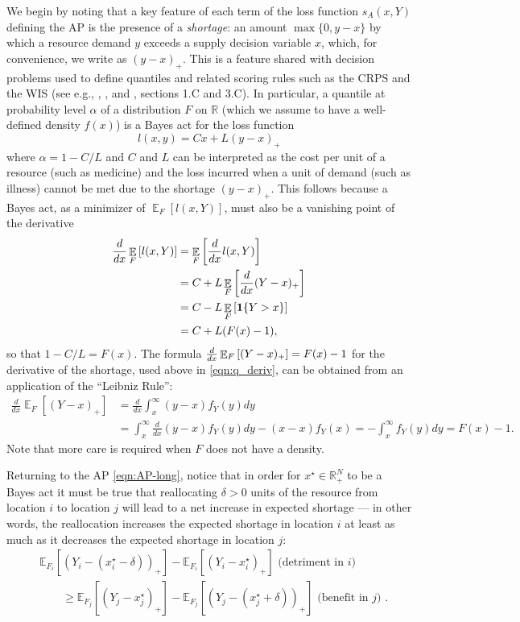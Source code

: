 \documentclass{article}\usepackage[]{graphicx}\usepackage[]{xcolor}
\DeclareMathOperator{\Ex}{\mathbb{E}}
\begin{document}
We begin by noting that a key feature of each term of the loss function $s_A(x, Y)$ defining the AP is the presence of 
a \emph{shortage}: an amount $\max\{0,y-x\}$ by which a resource demand $y$ exceeds a supply decision variable $x$,
which, for convenience, we write as $(y-x)_{+}$.  This is a feature shared with decision problems used to define quantiles 
and related scoring rules such as the
CRPS and the WIS (see e.g., \cite{gneiting2011quantiles}, \cite{jose2009evaluating}, and \cite{royset2022optimization},
sections 1.C and 3.C). In particular, 
a quantile at probability level $\alpha$ of a
distribution $F$ on $\mathbb{R}$ (which we assume to have a well-defined density $f(x)$) is a Bayes act for the loss
function
\[
l(x,y) = Cx + L(y-x)_{+}
\]
where $\alpha = 1-C/L$ and $C$ and $L$ can be interpreted as the cost per unit of a resource (such as medicine) and the
loss incurred when a unit of demand (such as illness) cannot be met due to the shortage $(y-x)_{+}$.  This follows
because a Bayes act, as a minimizer of $\Ex_F[l(x,Y)]$, must also be a vanishing point of the derivative
\begin{align}
\dby{}{x} \Ex_F\left[l(x,Y)\right] &= \Ex_F\left[\dby{}{x}l(x,Y)\right] \nonumber\\
&= C + L\Ex_F\left[\dby{}{x}(Y-x)_+\right] \nonumber\\
&= C - L\Ex_F\left[\mathbf{1}\{Y > x\}\right] \nonumber\\
&= C + L(F(x) - 1), \label{eqn:q_deriv}
\end{align}
so that $1-C/L = F(x)$.
The formula $\dby{}{x}\Ex_F\left[(Y-x)_+\right] = F(x) - 1$ for the derivative of the shortage, used above in
\eqref{eqn:q_deriv}, can be obtained from an application of the ``Leibniz Rule'':
\begin{align}
	\frac{d}{dx} \Ex_F [(Y-x)_{+}] &= \frac{d}{dx} \int_{x}^{\infty} (y-x) f_Y(y)dy \nonumber\\
	&= \int_{x}^{\infty} \frac{d}{dx}(y-x) f_Y(y)dy - (x-x) f_Y(x) = -\int_{x}^{\infty} f_Y(y)dy = F(x)-1. \label{eqn:shortage_deriv}
\end{align}
Note that more care is required when $F$ does not have a density.

Returning to the AP \eqref{eqn:AP-long}, notice that in order for $x^{\star} \in \mathbb{R}^N_{+}$ to be a Bayes act it must be true that reallocating $\delta > 0$ units of
the resource from location $i$ to location $j$ will lead to a net increase in expected shortage --- in other words, the
reallocation increases the expected shortage in location $i$ at least as much as it decreases the expected shortage
in location $j$:
\begin{align*}
&\mathbb{E}_{F_i}[(Y_i - (x^{\star}_i - \delta))_{+}] - \mathbb{E}_{F_i}[(Y_i - x^{\star}_i)_{+}]
\text{ (detriment in $i$) } \nonumber \\
&\qquad \geq
\mathbb{E}_{F_j}[(Y_j - x^{\star}_j)_{+}] - \mathbb{E}_{F_j}[(Y_j - (x^{\star}_j + \delta))_{+}]
\text{ (benefit in $j$) }.
\end{align*}
\end{document}

